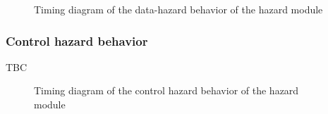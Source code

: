       \begin{figure}[H]
          \centering
          
          \caption{Timing diagram of the data-hazard behavior of the hazard module}
          \label{fig:hzdm-behavior-data-hazard}
        \end{figure}

    \subsubsection{Control hazard behavior}

      \begin{content}
          TBC
        \end{content}

      \begin{figure}[H]
          \centering
          
          \caption{Timing diagram of the control hazard behavior of the hazard module}
          \label{fig:hzdm-behavior-control-hazard}
        \end{figure}

\newpage

